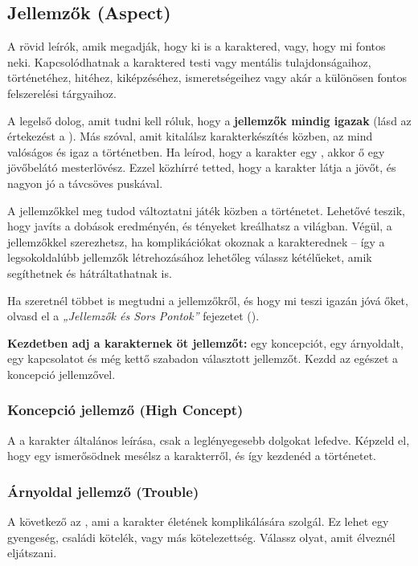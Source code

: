 \subsection[Jellemzők]{Jellemzők (Aspect)}

A  rövid leírók, amik megadják, hogy ki is a karaktered, vagy, hogy mi fontos neki. Kapcsolódhatnak a karaktered testi vagy mentális tulajdonságaihoz, történetéhez, hitéhez, kiképzéséhez, ismeretségeihez vagy akár a különösen fontos felszerelési tárgyaihoz.

A legelső dolog, amit tudni kell róluk, hogy a \textbf{jellemzők mindig igazak} (lásd az értekezést a ). Más szóval, amit kitalálsz karakterkészítés közben, az mind valóságos és igaz a történetben. Ha leírod, hogy a karakter egy , akkor ő egy jövőbelátó mesterlövész. Ezzel közhírré tetted, hogy a karakter látja a jövőt, és nagyon jó a távcsöves puskával.

A jellemzőkkel meg tudod változtatni játék közben a történetet. Lehetővé teszik, hogy javíts a dobások eredményén, és tényeket kreálhatsz a világban. Végül, a jellemzőkkel  szerezhetsz, ha komplikációkat okoznak a karakterednek -- így a legsokoldalúbb jellemzők létrehozásához lehetőleg válassz kétélűeket, amik segíthetnek és hátráltathatnak is.

Ha szeretnél többet is megtudni a jellemzőkről, és hogy mi teszi igazán jóvá őket, olvasd el a \textit{„Jellemzők és Sors Pontok”} fejezetet ().

\textbf{Kezdetben adj a karakternek öt jellemzőt:} egy koncepciót, egy árnyoldalt, egy kapcsolatot és még kettő szabadon választott jellemzőt. Kezdd az egészet a koncepció jellemzővel.

\subsubsection{Koncepció jellemző (High Concept)}

A  a karakter általános leírása, csak a leglényegesebb dolgokat lefedve. Képzeld el, hogy egy ismerősödnek mesélsz a karakterről, és így kezdenéd a történetet.

\subsubsection{Árnyoldal jellemző (Trouble)}

A következő az , ami a karakter életének komplikálására szolgál. Ez lehet egy gyengeség, családi kötelék, vagy más kötelezettség. Válassz olyat, amit élveznél eljátszani.

